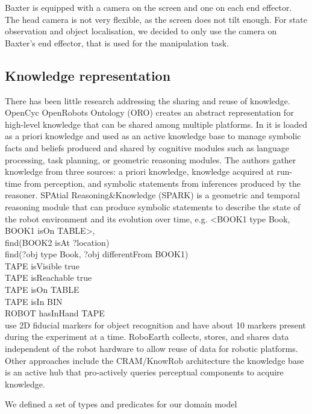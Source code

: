 Baxter is equipped with a camera on the screen and one on each end effector.
The head camera is not very flexible, as the screen does not tilt enough.
For state observation and object localisation, we decided to only use the camera on Baxter's end effector, that is used for the manipulation task.

\subsection{Knowledge representation} 
There has been little research addressing the sharing and reuse of knowledge.
OpenCyc \cite{lenat1990cyc}
OpenRobots Ontology (ORO) \cite{lemaignan2010oro} creates an abstract representation for high-level knowledge that can be shared among multiple platforms.
In \cite{lemaignan2017artificial} it is loaded as a priori knowledge and used as an active knowledge base to manage symbolic facts and beliefs produced and shared by cognitive modules such as language processing, task planning, or geometric reasoning modules.
The authors gather knowledge from three sources: a priori knowledge, knowledge acquired at run-time from perception, and symbolic statements from inferences produced by the reasoner.
SPAtial Reasoning\&Knowledge (SPARK) \cite{sisbot2011situation} is a geometric and temporal reasoning module that can produce symbolic statements to describe the state of the robot environment and its evolution over time, e.g. <BOOK1 type Book, BOOK1 isOn TABLE>, \\
find(BOOK2 isAt ?location) \\
find(?obj type Book, ?obj differentFrom BOOK1)\\
TAPE isVisible true \\
TAPE isReachable true\\ 
TAPE isOn TABLE\\
TAPE isIn BIN\\
ROBOT hasInHand TAPE\\
\cite{lemaignan2017artificial} use 2D fiducial markers for object recognition and have about 10 markers present during the experiment at a time.
RoboEarth \cite{waibel2011roboearth} collects, stores, and shares data independent of the robot hardware to allow reuse of data for robotic platforms.
Other approaches include the CRAM/KnowRob architecture \cite{bibid} the knowledge base is an active hub that pro-actively queries perceptual components to acquire knowledge.

We defined a set of types and predicates for our domain model 

